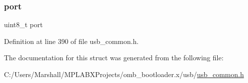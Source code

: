 \subsubsection{\texorpdfstring{port}{port}}
{\footnotesize\ttfamily uint8\+\_\+t port}



Definition at line 390 of file usb\+\_\+common.\+h.



The documentation for this struct was generated from the following file\+:\begin{DoxyCompactItemize}
\item 
C\+:/\+Users/\+Marshall/\+M\+P\+L\+A\+B\+X\+Projects/omb\+\_\+bootloader.\+x/usb/\mbox{\hyperlink{usb__common_8h}{usb\+\_\+common.\+h}}\end{DoxyCompactItemize}
